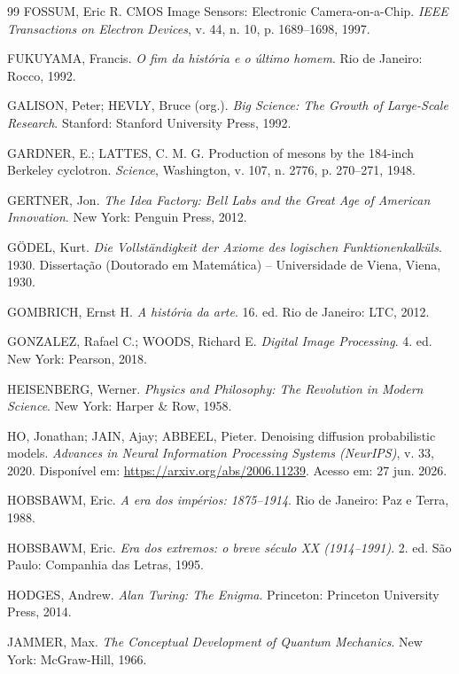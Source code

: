 \documentclass{hipatia}
\begin{document}
{\begin{thebibliography}{99}
FOSSUM, Eric R.
CMOS Image Sensors: Electronic Camera-on-a-Chip.
\textit{IEEE Transactions on Electron Devices},
v. 44, n. 10, p. 1689--1698, 1997.

FUKUYAMA, Francis.
\textit{O fim da história e o último homem}.
Rio de Janeiro: Rocco, 1992.

GALISON, Peter; HEVLY, Bruce (org.).
\textit{Big Science: The Growth of Large-Scale Research}.
Stanford: Stanford University Press, 1992.

GARDNER, E.; LATTES, C. M. G.
Production of mesons by the 184-inch Berkeley cyclotron.
\textit{Science},
Washington,
v. 107,
n. 2776,
p. 270--271,
1948.

GERTNER, Jon.
\textit{The Idea Factory: Bell Labs and the Great Age of American Innovation}.
New York: Penguin Press, 2012.

GÖDEL, Kurt.
\textit{Die Vollständigkeit der Axiome des logischen Funktionenkalküls}.
1930.
Dissertação (Doutorado em Matemática) --
Universidade de Viena,
Viena,
1930.

GOMBRICH, Ernst H.
\textit{A história da arte}.
16. ed.
Rio de Janeiro: LTC, 2012.

GONZALEZ, Rafael C.; WOODS, Richard E.
\textit{Digital Image Processing}.
4. ed.
New York: Pearson, 2018.

HEISENBERG, Werner.
\textit{Physics and Philosophy: The Revolution in Modern Science}.
New York: Harper \& Row, 1958.

HO, Jonathan; JAIN, Ajay; ABBEEL, Pieter.
Denoising diffusion probabilistic models.
\textit{Advances in Neural Information Processing Systems (NeurIPS)},
v. 33, 2020.
Disponível em:
\url{https://arxiv.org/abs/2006.11239}.
Acesso em: 27 jun. 2026.

HOBSBAWM, Eric.
\textit{A era dos impérios: 1875--1914}.
Rio de Janeiro: Paz e Terra, 1988.

HOBSBAWM, Eric.
\textit{Era dos extremos: o breve século XX (1914--1991)}.
2. ed.
São Paulo: Companhia das Letras, 1995.

HODGES, Andrew.
\textit{Alan Turing: The Enigma}.
Princeton: Princeton University Press, 2014.

JAMMER, Max.
\textit{The Conceptual Development of Quantum Mechanics}.
New York: McGraw-Hill, 1966.


\end{thebibliography}}
\end{document}
